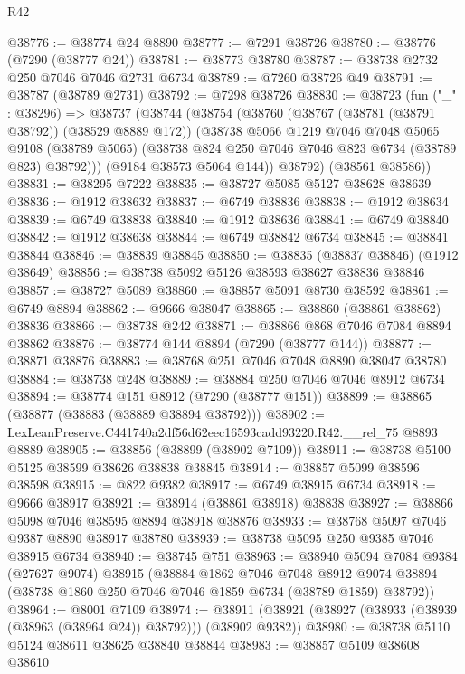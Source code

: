 \begin{lexlean}{R42}
\begin{coremodule}
{@38776 := @38774 @24 @8890
@38777 := @7291 @38726
@38780 := @38776 (@7290 (@38777 @24))
@38781 := @38773 @38780
@38787 := @38738 @2732 @250 @7046 @7046 @2731 @6734
@38789 := @7260 @38726 @49
@38791 := @38787 (@38789 @2731)
@38792 := @7298 @38726
@38830 := @38723
    (fun ("_" : @38296) =>
    @38737
      (@38744
        (@38754
          (@38760
            (@38767 (@38781 (@38791 @38792)) (@38529 @8889 @172))
            (@38738
              @5066
              @1219
              @7046
              @7048
              @5065
              @9108
              (@38789 @5065)
              (@38738 @824 @250 @7046 @7046 @823 @6734 (@38789 @823) @38792)))
          (@9184 @38573 @5064 @144))
        @38792)
      (@38561 @38586))
@38831 := @38295 @7222
@38835 := @38727 @5085 @5127 @38628 @38639
@38836 := @1912 @38632
@38837 := @6749 @38836
@38838 := @1912 @38634
@38839 := @6749 @38838
@38840 := @1912 @38636
@38841 := @6749 @38840
@38842 := @1912 @38638
@38844 := @6749 @38842 @6734
@38845 := @38841 @38844
@38846 := @38839 @38845
@38850 := @38835 (@38837 @38846) (@1912 @38649)
@38856 := @38738 @5092 @5126 @38593 @38627 @38836 @38846
@38857 := @38727 @5089
@38860 := @38857 @5091 @8730 @38592
@38861 := @6749 @8894
@38862 := @9666 @38047
@38865 := @38860 (@38861 @38862) @38836
@38866 := @38738 @242
@38871 := @38866 @868 @7046 @7084 @8894 @38862
@38876 := @38774 @144 @8894 (@7290 (@38777 @144))
@38877 := @38871 @38876
@38883 := @38768 @251 @7046 @7048 @8890 @38047 @38780
@38884 := @38738 @248
@38889 := @38884 @250 @7046 @7046 @8912 @6734
@38894 := @38774 @151 @8912 (@7290 (@38777 @151))
@38899 := @38865 (@38877 (@38883 (@38889 @38894 @38792)))
@38902 := LexLeanPreserve.C441740a2df56d62eec16593cadd93220.R42.__rel_75 @8893 @8889
@38905 := @38856 (@38899 (@38902 @7109))
@38911 := @38738 @5100 @5125 @38599 @38626 @38838 @38845
@38914 := @38857 @5099 @38596 @38598
@38915 := @822 @9382
@38917 := @6749 @38915 @6734
@38918 := @9666 @38917
@38921 := @38914 (@38861 @38918) @38838
@38927 := @38866 @5098 @7046 @38595 @8894 @38918 @38876
@38933 := @38768 @5097 @7046 @9387 @8890 @38917 @38780
@38939 := @38738 @5095 @250 @9385 @7046 @38915 @6734
@38940 := @38745 @751
@38963 := @38940
    @5094
    @7084
    @9384
    (@27627 @9074)
    @38915
    (@38884
      @1862
      @7046
      @7048
      @8912
      @9074
      @38894
      (@38738 @1860 @250 @7046 @7046 @1859 @6734 (@38789 @1859) @38792))
@38964 := @8001 @7109
@38974 := @38911 (@38921 (@38927 (@38933 (@38939 (@38963 (@38964 @24)) @38792))) (@38902 @9382))
@38980 := @38738 @5110 @5124 @38611 @38625 @38840 @38844
@38983 := @38857 @5109 @38608 @38610
}
\end{coremodule}
\end{lexlean}
